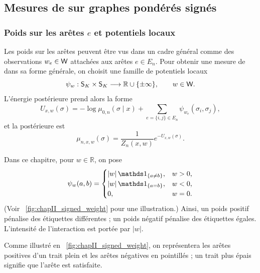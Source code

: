 \subsection{Mesures de  sur graphes pondérés signés}
\label{sec:chapII_gibbs_poids}

\subsubsection{Poids sur les arêtes $e$ et potentiels locaux}

Les poids sur les arêtes peuvent être vus dans un cadre général comme des observations $w_e\in\mathsf W$ attachées aux arêtes $e\in E_n$. Pour obtenir une mesure de  \cite{EdwardsSokal} dans sa forme générale, on choisit une famille de potentiels locaux \cite{EdwardsSokal}
\[
    \psi_w:\mathsf S_K\times\mathsf S_K\longrightarrow\mathbb R\cup\{\pm\infty\},
    \qquad w\in\mathsf W.
\]
L'énergie postérieure prend alors la forme
\begin{equation}
    U_{x,w}(\sigma)
    =
    -\log\mu_{0,n}(\sigma\mid x)
    +
    \sum_{e=\{i,j\}\in E_n}\psi_{w_e}(\sigma_i,\sigma_j),
    \label{eq:chapII_energy_general_weights}
\end{equation}
et la postérieure est
\begin{equation}
    \mu_{n,x,w}(\sigma)=\frac1{Z_n(x,w)}e^{-U_{x,w}(\sigma)}.
    \label{eq:chapII_gibbs_general_weights}
\end{equation}

Dans ce chapitre, pour $w\in\mathbb R$, on pose
\begin{equation}
    \psi_w(a,b)
    =
    \begin{cases}
        |w|\,\ind{a\neq b},& w>0,\\
        |w|\,\ind{a=b},& w<0,\\
        0,& w=0.
    \end{cases}
    \label{eq:chapII_signed_potential}
\end{equation}
(Voir \Fig~\ref{fig:chapII_signed_weight} pour une illustration.)
Ainsi, un poids positif pénalise des étiquettes différentes ; un poids négatif pénalise des étiquettes égales. L'intensité de l'interaction est portée par $|w|$. 

Comme illustré en \Fig~\ref{fig:chapII_signed_weight}, on représentera les arêtes positives d'un trait plein et les arêtes négatives en pointillés ; un trait plus épais signifie que l'arête est satisfaite.

